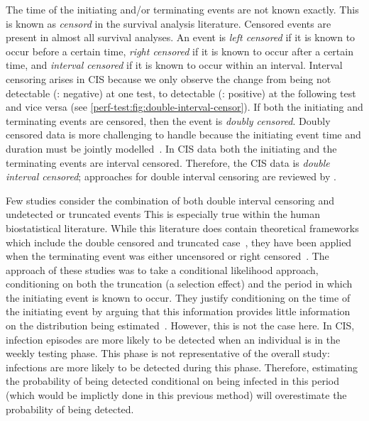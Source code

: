 \documentclass[thesis.tex]{subfiles}
\begin{document}
The time of the initiating and/or terminating events are not known exactly.
This is known as \emph{censord} in the survival analysis literature.
Censored events are present in almost all survival analyses.
An event is \emph{left censored} if it is known to occur before a certain time, \emph{right censored} if it is known to occur after a certain time, and \emph{interval censored} if it is known to occur within an interval.
Interval censoring arises in CIS because we only observe the change from being not detectable (\ie: negative) at one test, to detectable (\ie: positive) at the following test and vice versa (see \cref{perf-test:fig:double-interval-censor}).
If both the initiating and terminating events are censored, then the event is \emph{doubly censored}.
Doubly censored data is more challenging to handle because the initiating event time and duration must be jointly modelled~\autocite[and references therein]{liSemiparametric}.
In CIS data both the initiating and the terminating events are interval censored.
Therefore, the CIS data is \emph{double interval censored}; approaches for double interval censoring are reviewed by \textcite{sunAnalysis,bogaertsSurvival}.

Few studies consider the combination of both double interval censoring and undetected or truncated events
This is especially true within the human biostatistical literature.
While this literature does contain theoretical frameworks which include the double censored and truncated case~\autocites{turnbullEmpirical}{dempsterMaximum}, they have been applied when the terminating event was either uncensored or right censored~\autocite{sunEmpirical,bacchettiNonparametric}.
The approach of these studies \autocite[and elsewhere, e.g.:][]{shenNonparametric} was to take a conditional likelihood approach, conditioning on both the truncation (a selection effect) and the period in which the initiating event is known to occur.
They justify conditioning on the time of the initiating event by arguing that this information provides little information on the distribution being estimated~.
However, this is not the case here.
In CIS, infection episodes are more likely to be detected when an individual is in the weekly testing phase.
This phase is not representative of the overall study: infections are more likely to be detected during this phase.
Therefore, estimating the probability of being detected conditional on being infected in this period (which would be implictly done in this previous method)  will overestimate the probability of being detected.
\end{document}
